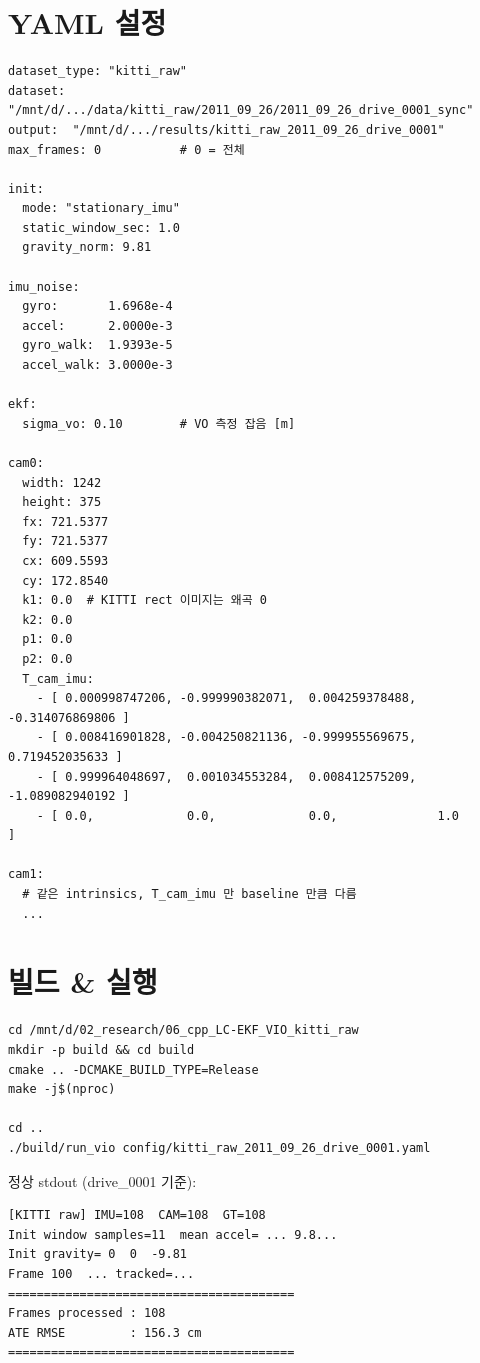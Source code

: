 \documentclass[11pt,a4paper,oneside]{report}
\begin{document}
\section{YAML 설정}

\begin{lstlisting}[style=yaml,caption={\texttt{config/kitti\_raw\_2011\_09\_26\_drive\_0001.yaml}}]
dataset_type: "kitti_raw"
dataset: "/mnt/d/.../data/kitti_raw/2011_09_26/2011_09_26_drive_0001_sync"
output:  "/mnt/d/.../results/kitti_raw_2011_09_26_drive_0001"
max_frames: 0           # 0 = 전체

init:
  mode: "stationary_imu"
  static_window_sec: 1.0
  gravity_norm: 9.81

imu_noise:
  gyro:       1.6968e-4
  accel:      2.0000e-3
  gyro_walk:  1.9393e-5
  accel_walk: 3.0000e-3

ekf:
  sigma_vo: 0.10        # VO 측정 잡음 [m]

cam0:
  width: 1242
  height: 375
  fx: 721.5377
  fy: 721.5377
  cx: 609.5593
  cy: 172.8540
  k1: 0.0  # KITTI rect 이미지는 왜곡 0
  k2: 0.0
  p1: 0.0
  p2: 0.0
  T_cam_imu:
    - [ 0.000998747206, -0.999990382071,  0.004259378488, -0.314076869806 ]
    - [ 0.008416901828, -0.004250821136, -0.999955569675,  0.719452035633 ]
    - [ 0.999964048697,  0.001034553284,  0.008412575209, -1.089082940192 ]
    - [ 0.0,             0.0,             0.0,              1.0           ]

cam1:
  # 같은 intrinsics, T_cam_imu 만 baseline 만큼 다름
  ...
\end{lstlisting}

\section{빌드 \& 실행}

\begin{lstlisting}[style=shell]
cd /mnt/d/02_research/06_cpp_LC-EKF_VIO_kitti_raw
mkdir -p build && cd build
cmake .. -DCMAKE_BUILD_TYPE=Release
make -j$(nproc)

cd ..
./build/run_vio config/kitti_raw_2011_09_26_drive_0001.yaml
\end{lstlisting}

정상 stdout (drive\_0001 기준):
\begin{lstlisting}[style=shell]
[KITTI raw] IMU=108  CAM=108  GT=108
Init window samples=11  mean accel= ... 9.8...
Init gravity= 0  0  -9.81
Frame 100  ... tracked=...
========================================
Frames processed : 108
ATE RMSE         : 156.3 cm
========================================
\end{lstlisting}
\end{document}
